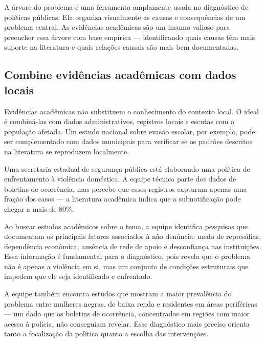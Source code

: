 \documentclass[12pt, a4paper, openany]{book}
\begin{document}
A árvore do problema é uma ferramenta amplamente usada no diagnóstico de
políticas públicas. Ela organiza visualmente as causas e consequências de um
problema central. As evidências acadêmicas são um insumo valioso para
preencher essa árvore com base empírica --- identificando quais causas têm
mais suporte na literatura e quais relações causais são mais bem documentadas.

\subsection{Combine evidências acadêmicas com dados locais}

Evidências acadêmicas não substituem o conhecimento do contexto local. O ideal
é combiná-las com dados administrativos, registros locais e escutas com a
população afetada. Um estudo nacional sobre evasão escolar, por exemplo, pode
ser complementado com dados municipais para verificar se os padrões descritos
na literatura se reproduzem localmente.

\begin{exemplobox}
Uma secretaria estadual de segurança pública está elaborando uma política de
enfrentamento à violência doméstica. A equipe técnica parte dos dados de
boletins de ocorrência, mas percebe que esses registros capturam apenas uma
fração dos casos --- a literatura acadêmica indica que a subnotificação pode
chegar a mais de 80\%.

Ao buscar estudos acadêmicos sobre o tema, a equipe identifica pesquisas que
documentam os principais fatores associados à não denúncia: medo de
represálias, dependência econômica, ausência de rede de apoio e desconfiança
nas instituições. Essa informação é fundamental para o diagnóstico, pois
revela que o problema não é apenas a violência em si, mas um conjunto de
condições estruturais que impedem que ele seja identificado e enfrentado.

A equipe também encontra estudos que mostram a maior prevalência do problema
entre mulheres negras, de baixa renda e residentes em áreas periféricas ---
um dado que os boletins de ocorrência, concentrados em regiões com maior
acesso à polícia, não conseguiam revelar. Esse diagnóstico mais preciso
orienta tanto a focalização da política quanto a escolha das intervenções.
\end{exemplobox}
\end{document}
